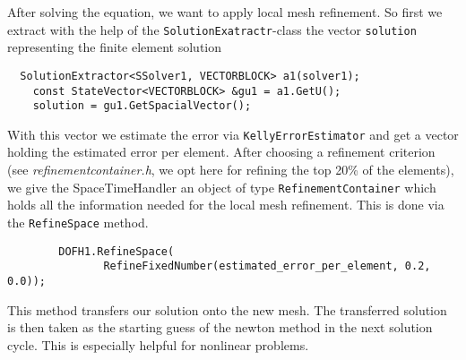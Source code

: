 After solving the equation, we want to apply local mesh refinement. So first we extract with the help of the \texttt{SolutionExatractr}-class the vector \texttt{solution} representing the finite element solution
\begin{verbatim}
  SolutionExtractor<SSolver1, VECTORBLOCK> a1(solver1);
 	const StateVector<VECTORBLOCK> &gu1 = a1.GetU();
 	solution = gu1.GetSpacialVector();
\end{verbatim}
With this vector we estimate the error via \texttt{KellyErrorEstimator} and get a vector holding the estimated error per element. After choosing a refinement criterion (see \textit{refinementcontainer.h}, we opt here for refining the top 20\% of the elements), we give the SpaceTimeHandler an object of type \texttt{RefinementContainer} which holds all the information needed for the local mesh refinement. This is done via the \texttt{RefineSpace} method.
\begin{verbatim}
        DOFH1.RefineSpace(
               RefineFixedNumber(estimated_error_per_element, 0.2, 0.0));
\end{verbatim}
This method transfers our solution onto the new mesh. The transferred solution is then taken as the starting guess of the newton method in the next solution cycle. This is especially helpful for nonlinear problems.
